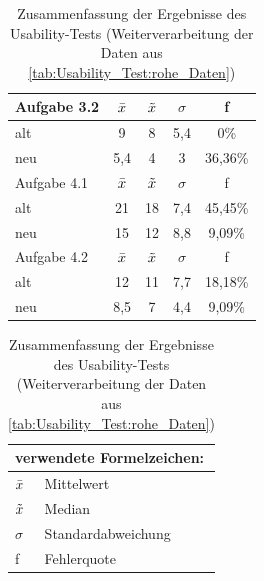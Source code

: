 \begin{table}[H]
\begin{tabular}{|l|c|c|c|c|}
\hline
Aufgabe 3.2   & $\Bar{x}$ & $\Tilde{x}$ & $\sigma$ & f \\ \hline
alt           & 9         &  8          &  5,4  &  0\%   \\ \hline
neu           & 5,4       &  4          &  3    &  36,36\%   \\ \hline
\hline
Aufgabe 4.1   & $\Bar{x}$ & $\Tilde{x}$ & $\sigma$ & f \\ \hline
alt           & 21        &  18         &  7,4  &  45,45\%   \\ \hline
neu           & 15        &  12         &  8,8  &  9,09\%   \\ \hline
\hline
Aufgabe 4.2   & $\Bar{x}$ & $\Tilde{x}$ & $\sigma$ & f \\ \hline
alt           & 12        &  11         &  7,7  &  18,18\%   \\ \hline
neu           & 8,5       &  7          &  4,4  &  9,09\%   \\ \hline
\end{tabular}

\begin{tabular}{ll}
\multicolumn{2}{l}{verwendete Formelzeichen:} \\ \hline
$\Bar{x}$          & Mittelwert               \\
$\Tilde{x}$        & Median                   \\
$\sigma$           & Standardabweichung       \\
f                  & Fehlerquote
\end{tabular}
\caption{Zusammenfassung der Ergebnisse des Usability-Tests (Weiterverarbeitung der Daten aus \autoref{tab:Usability_Test:rohe_Daten})}
\label{tab:usability_test:mittelwerte}
\end{table}


